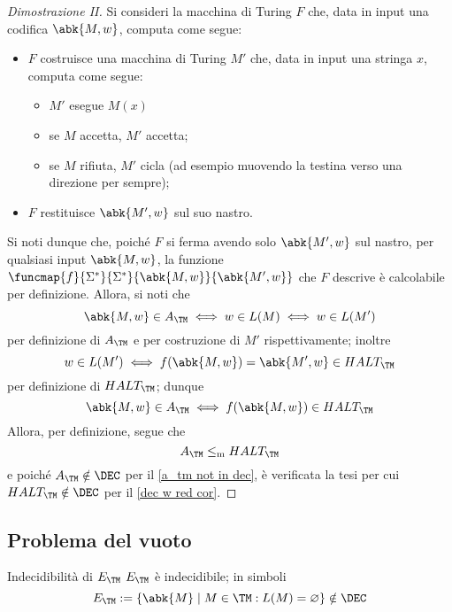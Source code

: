 \documentclass[a4paper, 12pt]{report}
\begin{document}
    \begin{proof}[Dimostrazione II]
        Si consideri la macchina di Turing $F$ che, data in input una codifica $\abk{M, w}$, computa come segue:

        \begin{itemize}
            \item $F$ costruisce una macchina di Turing $M'$ che, data in input una stringa $x$, computa come segue:
                \begin{itemize}
                    \item $M'$ esegue $M(x)$
                    \item se $M$ accetta, $M'$ accetta;
                    \item se $M$ rifiuta, $M'$ cicla (ad esempio muovendo la testina verso una direzione per sempre);
                \end{itemize}
            \item $F$ restituisce $\abk{M', w}$ sul suo nastro.
        \end{itemize}

        Si noti dunque che, poiché $F$ si ferma avendo solo $\abk{M', w}$ sul nastro, per qualsiasi input $\abk{M, w}$, la funzione $\funcmap{f}{\Sigma^*}{\Sigma^*}{\abk{M, w}}{\abk{M', w}}$ che $F$ descrive è calcolabile per definizione. Allora, si noti che $$\abk{M, w} \in A_\TM \iff w \in L(M) \iff w \in L(M')$$ per definizione di $A_\TM$ e per costruzione di $M'$ rispettivamente; inoltre $$w \in L(M') \iff f(\abk{M, w}) = \abk{M', w} \in HALT_\TM$$ per definizione di $HALT_\TM$; dunque $$\abk{M, w} \in A_\TM \iff f(\abk{M, w}) \in HALT_\TM$$ Allora, per definizione, segue che $$A_\TM \leq_\mathrm m HALT_\TM$$ e poiché $A_\TM \notin \DEC$ per il \cref{a_tm not in dec}, è verificata la tesi per cui $HALT_\TM \notin \DEC$ per il \cref{dec w red cor}.
    \end{proof}

    \subsection{Problema del vuoto}

    \begin{framedthm}[label={e_tm not in dec}]{Indecidibilità di $E_\TM$}
        $E_\TM$ è indecidibile; in simboli $$E_\TM := \{\abk{M} \mid M \in \TM : L(M) = \varnothing \} \notin \DEC$$
    \end{framedthm}
\end{document}
